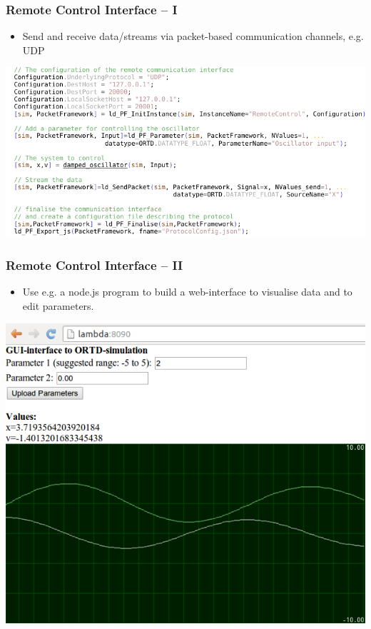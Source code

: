 \documentclass[serif,9pt,xcolor=dvipsnames]{beamer}
\begin{document}
\begin{frame}
  \frametitle{Remote Control Interface -- I}

  \begin{itemize}
    \item Send and receive data/streams via packet-based communication channels, e.g. UDP
  \end{itemize}
  \centering \includegraphics[width=1\linewidth]{figures/RemoteControl_Cut_crop.pdf} 

\end{frame}

\begin{frame}
  \frametitle{Remote Control Interface -- II}

  \begin{itemize}
    \item Use e.g. a node.js program to build a web-interface to visualise data and to edit parameters.
  \end{itemize}

  \centering \includegraphics[width=0.8\linewidth]{figures/Webinterface.png} 

\end{frame}
\end{document}
